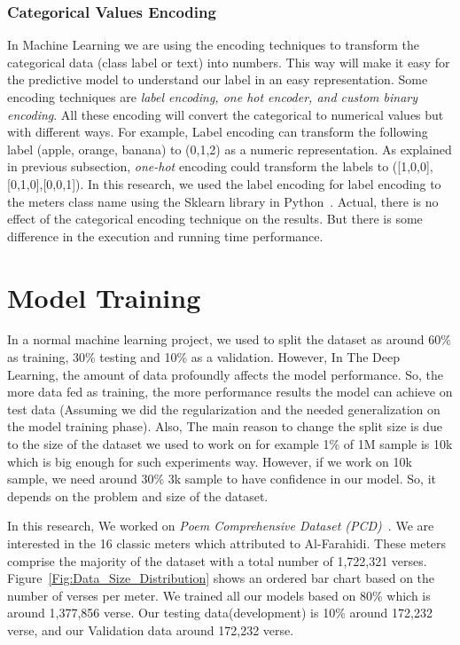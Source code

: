 \subsubsection{Categorical Values Encoding}\label{sec:label_encoder}

  In Machine Learning we are using the encoding techniques to transform the categorical data (class label or
text) into numbers. This way will make it easy for the predictive model to understand our label in an easy representation. Some encoding techniques are \textit{label encoding, one hot encoder, and custom \textit{binary} encoding}. All these encoding will convert the categorical to numerical values but with different ways. For example, Label encoding can transform the following label (apple, orange, banana) to (0,1,2) as a numeric representation. As explained in previous subsection, \textit{one-hot} encoding could transform the labels to ([1,0,0],[0,1,0],[0,0,1]). In this research, we used the label encoding for label encoding to the meters class name using the Sklearn library in Python~\cite{scikit-learn}. Actual, there is no effect of the categorical encoding technique on the results. But there is some difference in the execution and running time performance.

\clearpage

\section{Model Training}
In a normal machine learning project, we used to split the dataset as around 60\% as training, 30\% testing and 10\% as a validation. However, In The Deep Learning, the amount of data profoundly affects the model performance. So, the more data fed as training, the more performance results the model can achieve on test data (Assuming we did the regularization and the needed generalization on the model training phase). Also, The main reason to change the split size is due to the size of the dataset we used to work on for example 1\% of 1M sample is 10k which is big enough for such experiments way. However, if we work on 10k sample, we need around 30\% 3k sample to have confidence in our model. So, it depends on the problem and size of the dataset.

In this research, We worked on \textit{Poem Comprehensive Dataset (PCD)}~\cite{ArabicpoetryDS}. We are interested in the 16 classic meters which attributed to Al-Farahidi. These meters comprise the majority of the dataset with a total number of 1,722,321 verses. Figure~\ref{Fig:Data_Size_Distribution} shows an ordered bar chart based on the number of verses per meter. We trained all our models based on 80\% which is around 1,377,856 verse. Our testing data(development) is 10\% around 172,232 verse, and our Validation data around 172,232 verse.

